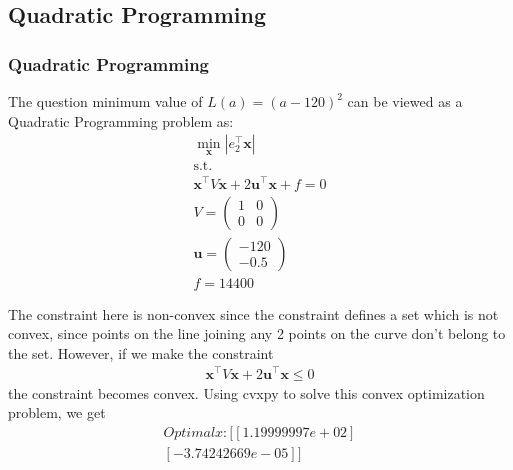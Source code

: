 \documentclass{beamer}
\providecommand{\brak}[1]{\ensuremath{\left(#1\right)}}
\theoremstyle{remark}
\providecommand{\abs}[1]{\left\vert#1\right\vert}
\newcommand{\myvec}[1]{\ensuremath{\begin{pmatrix}#1\end{pmatrix}}}
\let\vec\mathbf
\numberwithin{equation}{section}
\begin{document}
\subsection{Quadratic Programming}
\begin{frame}
\frametitle{Quadratic Programming}
The question minimum value of $L\brak{a} = \brak{a-120}^2$ can be viewed as a Quadratic Programming problem as:\\
\begin{align}
    \min_{\vec{x}} \abs{e_2^{\top}\vec{x}}\\
    \text{s.t. } \\ \vec{x}^{\top}V\vec{x} + 2\vec{u}^{\top}\vec{x} + f = 0\\
    V = \myvec{1 & 0 \\ 0 & 0}\\
    \vec{u} = \myvec{-120 \\ -0.5}\\
    f = 14400
\end{align}
\end{frame}
\begin{frame}
The constraint here is non-convex since the constraint defines a set which is not convex, since points on the
line joining any 2 points on the curve don't belong to the set. However, if we make the constraint
\begin{align}
    \vec{x}^{\top}V\vec{x} + 2\vec{u}^{\top}\vec{x} \le 0
\end{align}
the constraint becomes convex. Using cvxpy to solve this convex optimization problem, we get \\
\begin{align}
    Optimal x: [[ 1.19999997e+02]\\
 [-3.74242669e-05]]
\end{align}
\end{frame}
\end{document}
